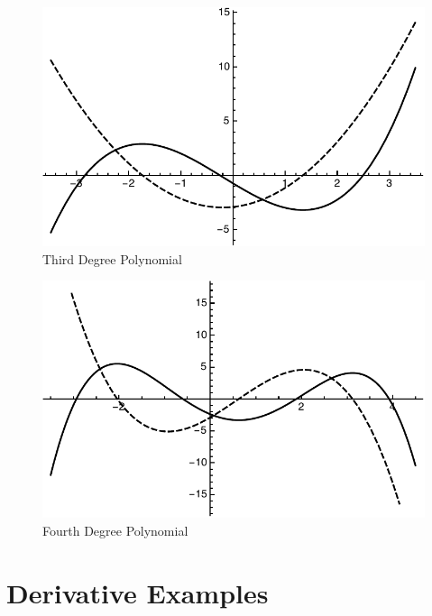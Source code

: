 \documentclass[letterpaper, landscape]{exam}
\begin{document}
  \begin{figure}[H]
    \centering
    \includegraphics[scale = 0.5]{example01.pdf}
    \caption{Third Degree Polynomial}
    \label{fig:example01}
  \end{figure}

  \begin{figure}[H]
    \centering
    \includegraphics[scale = 0.5]{example02.pdf}
    \caption{Fourth Degree Polynomial}
    \label{fig:example02}
  \end{figure}

  \section{Derivative Examples}
\end{document}
